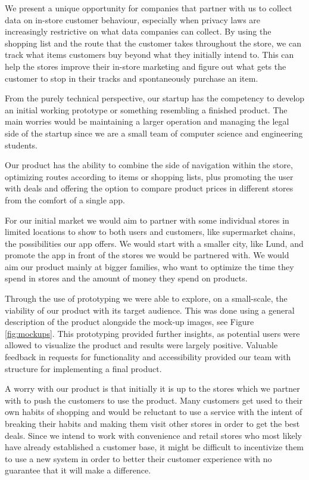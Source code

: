 \documentclass[titlepage]{article}
\begin{document}
We present a unique opportunity for companies that partner with us to collect data on in-store customer behaviour, especially when privacy laws are increasingly restrictive on what data companies can collect. By using the shopping list and the route that the customer takes throughout the store, we can track what items customers buy beyond what they initially intend to. This can help the stores improve their in-store marketing and figure out what gets the customer to stop in their tracks and spontaneously purchase an item.

From the purely technical perspective, our startup has the competency to develop an initial working prototype or something resembling a finished product. The main worries would be maintaining a larger operation and managing the legal side of the startup since we are a small team of computer science and engineering students.

Our product has the ability to combine the side of navigation within the store, optimizing routes according to items or shopping lists, plus promoting the user with deals and offering the option to compare product prices in different stores from the comfort of a single app.

For our initial market we would aim to partner with some individual stores in limited locations to show to both users and customers, like supermarket chains, the possibilities our app offers. We would start with a smaller city, like Lund, and promote the app in front of the stores we would be partnered with. We would aim our product mainly at bigger families, who want to optimize the time they spend in stores and the amount of money they spend on products.

Through the use of prototyping we were able to explore, on a small-scale, the viability of our product with its target audience. This was done using a general description of the product alongside the mock-up images, see Figure \ref{fig:mockups}.
This prototyping provided further insights, as potential users were allowed to visualize the product and results were largely positive. Valuable feedback in requests for functionality and accessibility provided our team with structure for implementing a final product.

A worry with our product is that initially it is up to the stores which we partner with to push the customers to use the product. Many customers get used to their own habits of shopping and would be reluctant to use a service with the intent of breaking their habits and making them visit other stores in order to get the best deals. Since we intend to work with convenience and retail stores who most likely have already established a customer base, it might be difficult to incentivize them to use a new system in order to better their customer experience with no guarantee that it will make a difference.
\end{document}
